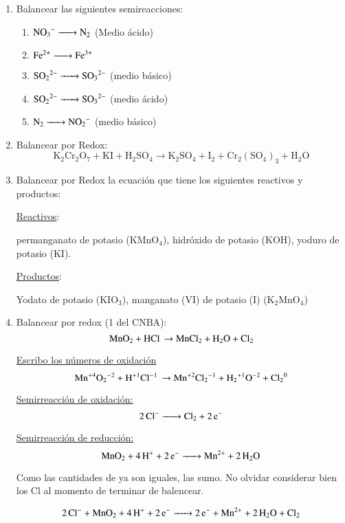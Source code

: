 \begin{enumerate}
\item Balancear las siguientes semireacciones:
\begin{enumerate}
    \item $\ce{ NO_3^- -> N_2 }$ (Medio ácido)
    \item $\ce{ Fe^{2+} -> Fe^{3+} }$
    \item $\ce{ SO_2^{\;2-} -> SO_3^{\;2-} }$ (medio básico)
    \item $\ce{ SO_2^{\;2-} -> SO_3^{\;2-} }$ (medio ácido)
    \item $\ce{ N_2 -> NO_2^- }$ (medio básico)
\end{enumerate}


\item Balancear por Redox:
$$\text{K}_2\text{Cr}_2\text{O}_7 + \text{KI} + \text{H}_2\text{SO}_4 \longrightarrow \text{K}_2\text{SO}_4 + \text{I}_2 + \text{Cr}_2(\text{SO}_4)_3 + \text{H}_2\text{O}$$


\item Balancear por Redox la ecuación que tiene los siguientes reactivos y productos:

\underline{Reactivos}:

permanganato de potasio (KMnO$_4$), hidróxido de potasio (KOH), yoduro de potasio (KI).

\skipline
\underline{Productos}:

Yodato de potasio (KIO$_3$), manganato (VI) de potasio (I) (K$_2$MnO$_4$)

\newpage
\item Balancear por redox (1 del CNBA):
$$\ce{MnO_2 + HCl \rightarrow MnCl_2 + H_2O + Cl_2}$$

\underline{Escribo los números de oxidación}
$$\ce{Mn^{+4}O_2^{-2} + H^{+1}Cl^{-1} \rightarrow Mn^{+2}Cl_2^{-1} + H_2^{+1}O^{-2} + Cl_2^{0}}$$

\begin{multicols}{2}
    \underline{Semirreacción de oxidación:}
    $$\ce{2Cl^- ->
    Cl_2 + 2e^-}$$
    
    \underline{Semirreacción de reducción:}
    $$\ce{MnO_2 + 4 H^+ + 2e^- ->
    Mn^{2+} + 2H_2O}$$
\end{multicols}

Como las cantidades de  ya son iguales, las sumo. No olvidar considerar bien los Cl al momento de terminar de balencear.

$$\ce{2 Cl^- + MnO_2 + 4H^+ + 2e^- -> 2e^- + Mn^{2+} + 2H_2O + Cl_2}$$


\end{enumerate}
